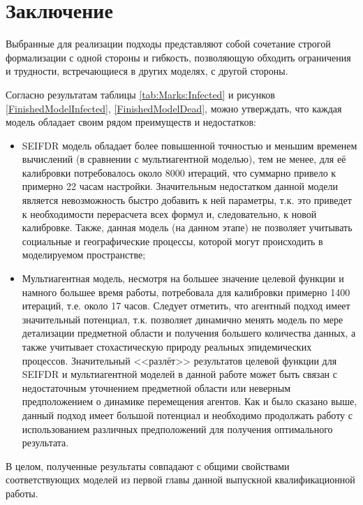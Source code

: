 \newpage
\parindent=1cm %
\section*{Заключение} %

Выбранные для реализации подходы представляют собой сочетание строгой формализации с одной стороны и гибкость, позволяющую обходить ограничения и трудности, встречающиеся в других моделях, с другой стороны. 

Согласно результатам таблицы \ref{tab:Marks:Infected} и рисунков \ref{FinishedModelInfected}, \ref{FinishedModelDead}, можно утверждать, что каждая модель обладает своим рядом преимуществ и недостатков: 
\begin{itemize}
	\item SEIFDR модель обладает более повышенной точностью и меньшим временем вычислений (в сравнении с мультиагентной моделью), тем не менее, для её калибровки потребовалось около 8000 итераций, что суммарно привело к  примерно 22 часам настройки. Значительным недостатком данной модели является невозможность быстро добавить к ней параметры, т.к. это приведет к необходимости перерасчета всех формул и, следовательно, к новой калибровке. Также, данная модель (на данном этапе) не позволяет учитывать социальные и географические процессы, которой могут происходить в моделируемом пространстве;
	\item Мультиагентная модель, несмотря на большее значение целевой функции и намного большее время работы, потребовала для калибровки примерно 1400 итераций, т.е. около 17 часов. Следует отметить, что агентный подход имеет значительный потенциал, т.к. позволяет динамично менять модель по мере детализации предметной области и получения большего количества данных, а также учитывает стохастическую природу реальных эпидемических процессов. Значительный <<разлёт>> результатов целевой функции для SEIFDR и мультиагентной моделей в данной работе может быть связан с недостаточным уточнением предметной области или неверным предположением о динамике перемещения агентов. Как и было сказано выше, данный подход имеет большой потенциал и необходимо продолжать работу с использованием различных предположений для получения оптимального результата.
\end{itemize}
В целом, полученные результаты совпадают с общими свойствами соответствующих моделей из первой главы данной выпускной квалификационной работы.


